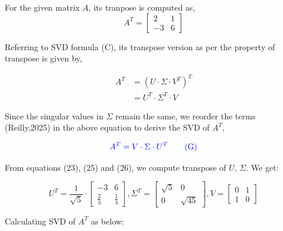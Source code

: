 \documentclass[a4paper]{report}
\begin{document}
For the given matrix $A$, its tranpose is computed as, \[A^T=\begin{bmatrix}
    2&1\\-3&6
\end{bmatrix}\]

Referring to SVD formula (C), its transpose version as per the property of transpose is given by,

\begin{align*}
    A^T&=(U\cdot \Sigma \cdot V^T)^{T} \\
    &=U^T\cdot \Sigma^T \cdot V
\end{align*}

Since the singular values in $\Sigma$ remain the same, we reorder the terms (Reilly,2025) in the above equation to derive the SVD of $A^T$,

\begin{equation}
    \color{blue} A^T=V\cdot\Sigma \cdot U^T \tag{G}
\end{equation}


From equations (23), (25) and (26), we compute transpose of $U$, $\Sigma$. We get:


\[U^T=\frac{1}{\sqrt{5}}\cdot\begin{bmatrix}
    -3&6\\ \frac{2}{3}&\frac{1}{3}
\end{bmatrix} , \Sigma^T=\begin{bmatrix}
    \sqrt{5}&0\\0&\sqrt{45}
\end{bmatrix}, V=\begin{bmatrix}
    0&1\\1&0
\end{bmatrix}\]

Calculating SVD of $A^T$ as below:
\end{document}
